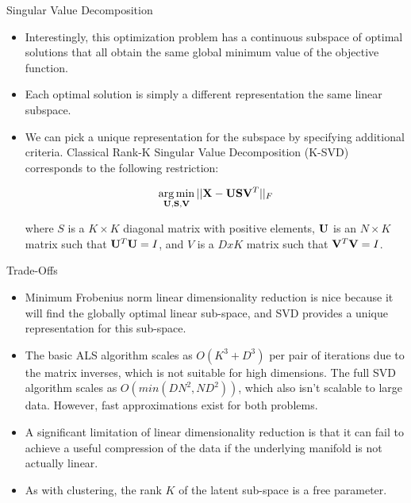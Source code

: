 \documentclass[serif,xcolor=pdftex,dvipsnames,table,hyperref={bookmarks=false,breaklinks}]{beamer}
\begin{document}
\begin{frame}[t]{Singular Value Decomposition}
 
\begin{itemize}
\item Interestingly, this optimization problem has a continuous subspace of 
optimal solutions that all obtain the same global minimum value of the 
objective function. 

\pause\item Each optimal solution is simply a different representation the same
linear subspace.

\pause\item We can pick a unique representation for the subspace by 
specifying additional criteria. Classical Rank-K Singular Value Decomposition 
(K-SVD) corresponds to the following restriction:

$$\operatorname*{arg\,min}_{{\mathbf{U}},{\mathbf{S}},{\mathbf{V}}} ||{\mathbf{X}} - {\mathbf{U}}{\mathbf{S}}{\mathbf{V}}^T ||_F$$

where $S$ is a $K\times K$ diagonal matrix with positive elements,  
${\mathbf{U}}$ is an $N\times K$ matrix such that  ${\mathbf{U}}^T{\mathbf{U}}=I$, and $V$
is a $DxK$ matrix such that ${\mathbf{V}}^T{\mathbf{V}}=I$.

\end{itemize} 
\end{frame}

\begin{frame}[t]{Trade-Offs}
 
\begin{itemize}
\item Minimum Frobenius norm linear dimensionality reduction is nice because 
it will find the globally optimal linear sub-space, and SVD provides a 
unique representation for this sub-space.

\pause\item The basic ALS algorithm scales as $O(K^3 + D^3)$ per pair of 
iterations due to the matrix inverses, which is not suitable for high 
dimensions. The full SVD algorithm scales as $O(min(DN^2, ND^2))$, which also 
isn't scalable to large data. However, fast approximations exist for both 
problems.

\pause\item A significant limitation of linear dimensionality reduction is that
it can fail to achieve a useful compression of the data if the underlying 
manifold is not actually linear.

\pause\item As with clustering, the rank $K$ of the latent sub-space is a free 
parameter.

\end{itemize} 
\end{frame}
\end{document}
